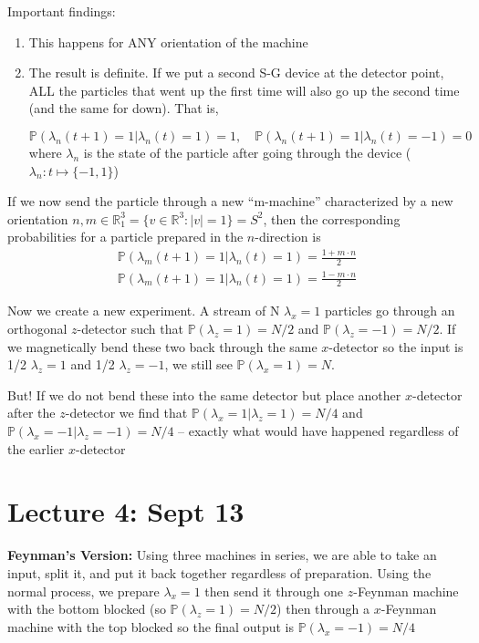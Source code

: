 \documentclass[12pt]{article}
\renewcommand{\P}{\mathbb{P}}
\newcommand{\R}{\mathbb{R}}
\begin{document}
Important findings:
\begin{enumerate}
    \item This happens for ANY orientation of the machine
    \item The result is definite. If we put a second S-G device at the detector point, ALL the particles that went up the first time will also go up the second time (and the same for down). That is,
    
    \[\P(\lambda_n(t + 1) = 1 | \lambda_n(t) = 1) = 1, \quad \P(\lambda_n(t + 1)=  1 | \lambda_n(t) = -1) = 0\]
    where $\lambda_n$ is the state of the particle after going through the device ($\lambda_n : t \mapsto \{-1, 1\}$)
\end{enumerate}

If we now send the particle through a new ``m-machine'' characterized by a new orientation $n, m \in \R_1^3 = \{v \in \R^3 : |v| = 1\} = S^2$, then the corresponding probabilities for a particle prepared in the $n$-direction is 
\begin{align*}
    \P(\lambda_m(t + 1) = 1 | \lambda_n(t) = 1) = \frac{1 + m \cdot n}{2}\\
    \P(\lambda_m(t + 1) = 1 | \lambda_n(t) = 1) = \frac{1 - m \cdot n}{2}
\end{align*}

Now we create a new experiment. A stream of N $\lambda_x = 1$ particles go through an orthogonal $z$-detector such that $\P(\lambda_z = 1) = N/2$ and $\P(\lambda_z = -1) = N/2$. If we magnetically bend these two back through the same $x$-detector so the input is 1/2 $\lambda_z = 1$ and 1/2 $\lambda_z = -1$, we still see $\P(\lambda_x = 1) = N$. 

But! If we do not bend these into the same detector but place another $x$-detector after the $z$-detector we find that $\P(\lambda_x = 1 | \lambda_z = 1) = N/4$ and $\P(\lambda_x = -1 | \lambda_z = -1 ) = N/4$ -- exactly what would have happened regardless of the earlier $x$-detector

\section*{Lecture 4: Sept 13}
\textbf{Feynman's Version:}
Using three machines in series, we are able to take an input, split it, and put it back together regardless of preparation. Using the normal process, we prepare $\lambda_x = 1$ then send it through one $z$-Feynman machine with the bottom blocked (so $\P(\lambda_z = 1) = N/2$) then through a $x$-Feynman machine with the top blocked so the final output is $\P(\lambda_x = -1) = N/4$
\end{document}
